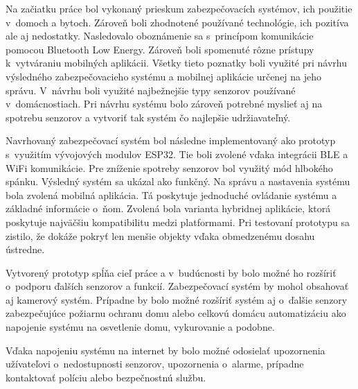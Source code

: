 Na začiatku práce bol vykonaný prieskum zabezpečovacích systémov, ich použitie v~domoch a bytoch. Zároveň boli zhodnotené používané technológie, ich pozitíva ale aj nedostatky. Nasledovalo oboznámenie sa s~princípom komunikácie pomocou Bluetooth Low Energy. Zároveň boli spomenuté rôzne prístupy k~vytváraniu mobilných aplikácii. Všetky tieto poznatky boli využité pri návrhu výsledného zabezpečovacieho systému a mobilnej aplikácie určenej na jeho správu. V~návrhu boli využité najbežnejšie typy senzorov používané v~domácnostiach. Pri návrhu systému bolo zároveň potrebné myslieť aj na spotrebu senzorov a vytvoriť tak systém čo najlepšie udržiavateľný.

Navrhovaný zabezpečovací systém bol následne implementovaný ako prototyp s~využitím vývojových modulov ESP32. Tie boli zvolené vďaka integrácii BLE a WiFi komunikácie. Pre zníženie spotreby senzorov bol využitý mód hlbokého spánku. Výsledný systém sa ukázal ako funkčný. Na správu a nastavenia systému bola zvolená mobilná aplikácia. Tá poskytuje jednoduché ovládanie systému a základné informácie o~ňom. Zvolená bola varianta hybridnej aplikácie, ktorá poskytuje najväčšiu kompatibilitu medzi platformami. Pri testovaní prototypu sa zistilo, že dokáže pokryť len menšie objekty vďaka obmedzenému dosahu ústredne.

Vytvorený prototyp spĺňa cieľ práce a v~budúcnosti by bolo možné ho rozšíriť o~podporu ďalších senzorov a funkcií. Zabezpečovací systém by mohol obsahovať aj kamerový systém. Prípadne by bolo možné rozšíriť systém aj o~ďalšie senzory zabezpečujúce požiarnu ochranu domu alebo celkovú domácu automatizáciu ako napojenie systému na osvetlenie domu, vykurovanie a podobne.

Vďaka napojeniu systému na internet by bolo možné odosielať upozornenia užívateľovi o~nedostupnosti senzorov, upozornenia o~alarme, prípadne kontaktovať políciu alebo bezpečnostnú službu.
